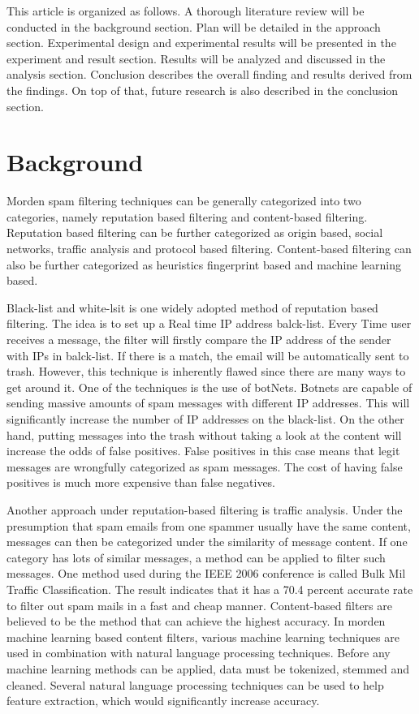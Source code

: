 \documentclass{article}
\begin{document}
This article is organized as follows. A thorough literature review will be conducted in the background section. Plan will be detailed in the approach section. Experimental design and experimental results will be presented in the experiment and result section. Results will be analyzed and discussed in the analysis section. Conclusion describes the overall finding and results derived from the findings. On top of that, future research is also described in the conclusion section. 
\section{Background}


Morden spam filtering techniques can be generally categorized into two categories, namely reputation based filtering and content-based filtering.\cite{Bhowmick} Reputation based filtering can be further categorized as origin based, social networks, traffic analysis and protocol based filtering. Content-based filtering can also be further categorized as heuristics fingerprint based and machine learning based.


Black-list and white-lsit is one widely adopted method of reputation based filtering. The idea is to set up a Real time IP address balck-list. \cite{Bhowmick}Every Time user receives a message, the filter will firstly compare the IP address of the sender with IPs in balck-list. If there is a match, the email will be automatically sent to trash. However, this technique is inherently flawed since there are many ways to get around it. One of the techniques is the use of botNets. Botnets are capable of sending massive amounts of spam messages with different IP addresses. This will significantly increase the number of IP addresses on the black-list. On the other hand, putting messages into the trash without taking a look at the content will increase the odds of false positives. False positives in this case means that legit messages are wrongfully categorized as spam messages. The cost of having false positives is much more expensive than false negatives.


Another approach under reputation-based filtering is traffic analysis.\cite{Zhang} Under the presumption that spam emails from one spammer usually have the same content, messages can then be categorized under the similarity of message content. If one category has lots of similar messages, a method can be applied to filter such messages. One method used during the IEEE 2006 conference is called Bulk Mil Traffic Classification. The result indicates that it has a 70.4 percent accurate rate to filter out spam mails in a fast and cheap manner. 
Content-based filters are believed to be the method that can achieve the highest accuracy. In morden machine learning based content filters, various machine learning techniques are used in combination with natural language processing techniques. Before any machine learning methods can be applied, data must be tokenized, stemmed and cleaned. Several natural language processing techniques can be used to help feature extraction, which would significantly increase accuracy. 
\end{document}
